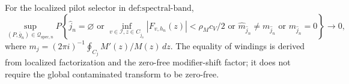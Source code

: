For the localized pilot selector in \(\text{def:spectral-band}\),
\[
 \sup_{(P,\bar g_n)\in\mathcal Q_{\mathrm{spec},n}}
 P\left\{\widehat j_n=\varnothing\text{ or }
 \inf_{v\in\mathcal I,z\in C_{\widehat j_n}}|F_{v,h_n}(z)|<\rho_Mc_V/2
 \text{ or }\widehat m_{\widehat j_n}\ne m_{\widehat j_n}
 \text{ or }m_{\widehat j_n}=0\right\}\longrightarrow0,
\]
where \(m_j=(2\pi i)^{-1}\oint_{C_j}M'(z)/M(z)\,dz\). The equality of windings is derived from localized factorization and the zero-free modifier-shift factor; it does not require the global contaminated transform to be zero-free.